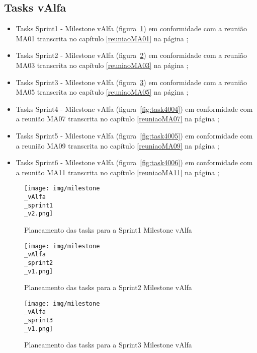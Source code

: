 
\subsection{Tasks vAlfa}

\begin{minipage}{\linewidth}
	\begin{itemize}
		\item Tasks Sprint1 - Milestone vAlfa (figura~\ref{fig:task4001}) em conformidade com a reunião MA01 transcrita no capítulo \ref{reuniaoMA01} na página \pageref{reuniaoMA01};
		\item Tasks Sprint2 - Milestone vAlfa (figura~\ref{fig:task4002}) em conformidade com a reunião MA03 transcrita no capítulo \ref{reuniaoMA03} na página \pageref{reuniaoMA03};
		\item Tasks Sprint3 - Milestone vAlfa (figura~\ref{fig:task4003}) em conformidade com a reunião MA05 transcrita no capítulo \ref{reuniaoMA05} na página \pageref{reuniaoMA05};
		\item Tasks Sprint4 - Milestone vAlfa (figura~\ref{fig:task4004}) em conformidade com a reunião MA07 transcrita no capítulo \ref{reuniaoMA07} na página \pageref{reuniaoMA07};
		\item Tasks Sprint5 - Milestone vAlfa (figura~\ref{fig:task4005}) em conformidade com a reunião MA09 transcrita no capítulo \ref{reuniaoMA09} na página \pageref{reuniaoMA09};
		\item Tasks Sprint6 - Milestone vAlfa (figura~\ref{fig:task4006}) em conformidade com a reunião MA11 transcrita no capítulo \ref{reuniaoMA11} na página \pageref{reuniaoMA11};
	\end{itemize}
\end{minipage}


\begin{figure}[htb]
	\centering
	\texttt{[image: img/milestone\\\_vAlfa\\\_sprint1\\\_v2.png]}  %
	\caption{Planeamento das tasks para a Sprint1 Milestone vAlfa}
	\label{fig:task4001}
\end{figure}


\begin{figure}[htb]
	\centering
	\texttt{[image: img/milestone\\\_vAlfa\\\_sprint2\\\_v1.png]}  %
	\caption{Planeamento das tasks para a Sprint2 Milestone vAlfa}
	\label{fig:task4002}
\end{figure}


\begin{figure}[htb]
	\centering
	\texttt{[image: img/milestone\\\_vAlfa\\\_sprint3\\\_v1.png]}  %
	\caption{Planeamento das tasks para a Sprint3 Milestone vAlfa}
	\label{fig:task4003}
\end{figure}


